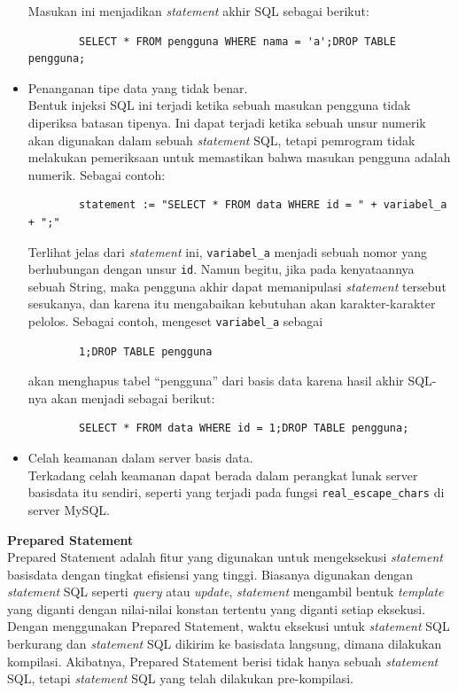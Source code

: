 \begin{itemize}
	Masukan ini menjadikan \textit{statement} akhir SQL sebagai berikut:

	\begin{lstlisting}
		SELECT * FROM pengguna WHERE nama = 'a';DROP TABLE pengguna; 
	\end{lstlisting}
	\item Penanganan tipe data yang tidak benar.\\
	Bentuk injeksi SQL ini terjadi ketika sebuah masukan pengguna tidak diperiksa batasan tipenya. Ini dapat terjadi ketika sebuah unsur numerik akan digunakan dalam sebuah \textit{statement} SQL, tetapi pemrogram tidak melakukan pemeriksaan untuk memastikan bahwa masukan pengguna adalah numerik. Sebagai contoh:
	
	\begin{lstlisting}
		statement := "SELECT * FROM data WHERE id = " + variabel_a + ";"
	\end{lstlisting}
	
	Terlihat jelas dari \textit{statement} ini, \verb!variabel_a! menjadi sebuah nomor yang berhubungan dengan unsur \verb!id!. Namun begitu, jika pada kenyataannya sebuah String, maka pengguna akhir dapat memanipulasi \textit{statement} tersebut sesukanya, dan karena itu mengabaikan kebutuhan akan karakter-karakter pelolos. Sebagai contoh, mengeset \verb!variabel_a! sebagai

	\begin{lstlisting}
		1;DROP TABLE pengguna
	\end{lstlisting}
	akan menghapus tabel ``pengguna'' dari basis data karena hasil akhir SQL-nya akan menjadi sebagai berikut:
	\begin{lstlisting}
		SELECT * FROM data WHERE id = 1;DROP TABLE pengguna;
	\end{lstlisting}
	
	\item Celah keamanan dalam server basis data.\\
	Terkadang celah keamanan dapat berada dalam perangkat lunak server basisdata itu sendiri, seperti yang terjadi pada fungsi \verb!real_escape_chars! di server MySQL.
\end{itemize}

\textbf{Prepared Statement}\\
Prepared Statement adalah fitur yang digunakan untuk mengeksekusi \textit{statement} basisdata dengan tingkat efisiensi yang tinggi.  Biasanya digunakan dengan \textit{statement} SQL seperti \textit{query} atau \textit{update}, \textit{statement} mengambil bentuk \textit{template} yang diganti dengan nilai-nilai konstan tertentu yang diganti setiap eksekusi. Dengan menggunakan Prepared Statement, waktu eksekusi untuk \textit{statement} SQL berkurang dan \textit{statement} SQL dikirim ke basisdata langsung, dimana dilakukan kompilasi. Akibatnya, Prepared Statement berisi tidak hanya sebuah \textit{statement} SQL, tetapi \textit{statement} SQL yang telah dilakukan pre-kompilasi.

